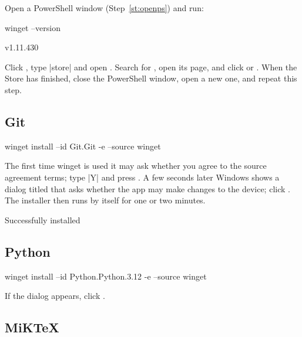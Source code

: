 Open a PowerShell window (Step~\ref{st:openps}) and run:
\begin{ps}
winget --version
\end{ps}
\begin{out}
v1.11.430
\end{out}

\begin{iffail}
Click , type \code|store| and open . Search for
, open its page, and click  or . When the Store has
finished, close the PowerShell window, open a new one, and repeat this step.
\end{iffail}

\subsection{Git}

\begin{ps}
winget install --id Git.Git -e --source winget
\end{ps}
The first time winget is used it may ask whether you agree to the source agreement terms; type
\code|Y| and press . A few seconds later Windows shows a dialog titled  that asks whether the app may make changes to the device; click . The
installer then runs by itself for one or two minutes.
\begin{out}
Successfully installed
\end{out}

\subsection{Python}

\begin{ps}
winget install --id Python.Python.3.12 -e --source winget
\end{ps}
If the  dialog appears, click .

\subsection{MiKTeX}

